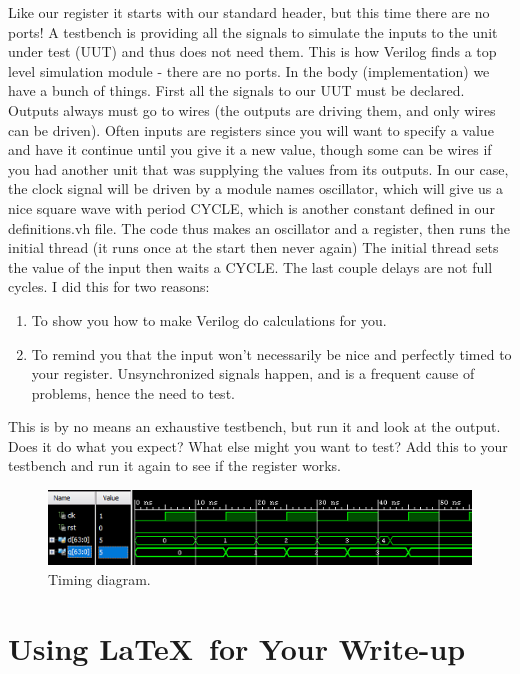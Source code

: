 Like our register it starts with our standard header, but this time there are no ports!  A testbench is providing all the signals to simulate the inputs to the unit under test (UUT) and thus does not need them.  This is how Verilog finds a top level simulation module - there are no ports.  In the body (implementation) we have a bunch of things.  First all the signals to our UUT must be declared.  Outputs always must go to wires (the outputs are driving them, and only wires can be driven).  Often inputs are registers since you will want to specify a value and have it continue until you give it a new value, though some can be wires if you had another unit that was supplying the values from its outputs.  In our case, the clock signal will be driven by a module names oscillator, which will give us a nice square wave with period CYCLE, which is another constant defined in our definitions.vh file.  The code thus makes an oscillator and a register, then runs the initial thread (it runs once at the start then never again)  The initial thread sets the value of the input then waits a CYCLE.  The last couple delays are not full cycles.  I did this for two reasons:
\begin{enumerate}
\item To show you how to make Verilog do calculations for you.
\item To remind you that the input won't necessarily be nice and perfectly timed to your register.  Unsynchronized signals happen, and is a frequent cause of problems, hence the need to test.
\end{enumerate}
This is by no means an exhaustive testbench, but run it and look at the output.  Does it do what you expect?  What else might you want to test?  Add this to your testbench and run it again to see if the register works.



\begin{figure}
\caption{Timing diagram.}\label{fig:registertiming}
\begin{center}
\includegraphics[width=4.75in]{../images/registertiming.png}
\end{center}
\end{figure}

\section{Using \LaTeX\ for Your Write-up}

